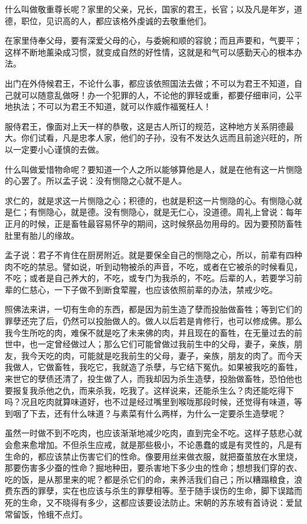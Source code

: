 \documentclass[12pt,twoside,openany]{book}
\begin{document}
什么叫做敬重尊长呢？家里的父亲，兄长，国家的君王，长官；以及凡是年岁，道德，职位，见识高的人，都应该格外虔诚的去敬重他们。

在家里侍奉父母，要有深爱父母的心，与委婉和顺的容貌；而且声要和，气要平；这样不断地薰染成习惯，就变成自然的好性情，这就是和气可以感勤天心的根本办法。

出门在外侍候君王，不论什么事，都应该依照国法去做；不可以为君王不知道，自己就可以随意乱做呀！办一个犯罪的人，不论他的罪轻或重，都要仔细审问，公平地执法；不可以为君王不知道，就可以作威作福冤枉人！

服侍君王，像面对上天一样的恭敬，这是古人所订的规范，这种地方关系阴德最大。你们试看，凡是忠孝人家，他们的子孙，没有不发达久远而且前途兴旺的，所以一定要小心谨慎的去做。

什么叫做爱惜物命呢？要知道一个人之所以能够算他是人，就是在他有这一片恻隐的心罢了。所以孟子说：没有恻隐之心就不是人。

求仁的，就是求这一片恻隐之心；积德的，也就是积这一片恻隐的心。有恻隐心就是仁；有恻隐心，就是德。没有恻隐心，就是无仁心，没道德。周礼上曾说：每年正月的时候，正是畜牲最容易怀孕的期间，这时候祭品勿用母的。因为要预防畜牲肚里有胎儿的缘故。

孟子说：君子不肯住在厨房附近。就是要保全自己的恻隐之心，所以，前辈有四种肉不吃的禁忌。譬如说，听到动物被杀的声音，不吃，或者在它被杀的时候看见，不吃；或者是自己养大的，不吃，或专门为我杀的，不吃。后辈的人，若要学习前辈的仁慈心，一下子做不到断食荤腥，也应该依照前辈的办法，禁戒少吃。

照佛法来讲，一切有生命的东西，都是因为前生造了孽而投胎做畜牲；等到它们的罪孽还完了后，仍然可以投胎做人的。做人以后若是肯修行，也可以修成佛。那么我今生所吃的肉，难保不就是吃了未来佛的肉，并且现在的畜牲，在无量过去的前世中，也一定曾经做过人；那么它们可能曾做过我前生中的父母，妻子，亲族，朋友，我今天吃的肉，可能就是吃我前生的父母，妻子，亲族，朋友的肉了。而今天我做人，它做畜牲，我吃它，我就造了杀孽，与它结下冤仇。如果被我吃的畜牲，来世它的孽债还清了，投生做了人，而我却因为杀生造孽，投胎做畜牲，恐怕他也要报复我杀他之仇，而来杀我，吃我了。这样说来，还能杀生么？肉还能吃得下吗？况且吃肉就算味道好，也不过是经过嘴里到喉咙那段时候，还觉得有味道，等到咽了下去，还有什么味道？与素菜有什么两样，为什么一定要杀生造孽呢？

虽然一时做不到不吃肉，也应该渐渐地减少吃肉，直到完全不吃。这样子慈悲心就会愈来愈增加。不但杀生应戒，就是那些极小，不论愚蠢的或是有灵性的，凡是有生命的，都应该禁止伤害它们的性命。像要用丝来做衣服，就把蚕茧放在水里烧，那要伤害多少蚕的性命？掘地种田，要杀害地下多少虫的性命；想想我们穿的衣、吃的饭，是从那里来的呢？都是杀它们的命，来养活我们自己；所以糟蹋粮食，浪费东西的罪孽，实在也应该与杀生的罪孽相等。至于随手误伤的生命，脚下误踏而死的生命，又不晓得有多少，这都应该要设法防止。宋朝的苏东坡有首诗说：爱鼠常留饭，怜蛾不点灯。
\end{document}
